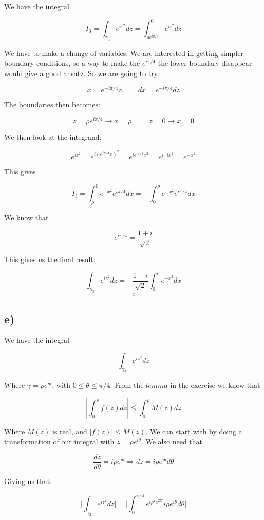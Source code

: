 \documentclass[a4paper,norsk, 10pt]{article}
\begin{document}
We have the integral

$$
\tilde{I}_ 3 = \int_{\gamma_3}e^{iz^2} dz = \int_{\rho e^{i\pi/4}}^0 e^{iz^2} dz 
$$

We have to make a change of variables. We are interested in getting simpler boundary conditions, so a way to make the $e^{i\pi/4}$ the lower boundary disappear would give a good ansatz. So we are going to try:

$$
x = e^{-i\pi/4}z. \qquad dx = e^{-i\pi /4}dz
$$

The boundaries then becomes:

$$
z = \rho e^{i\pi/4} \rightarrow x = \rho, \qquad z = 0 \rightarrow x = 0
$$

We then look at the integrand:

$$
e^{iz^2} = e^{i(e^{i\pi/4}x)^2} = e^{ie^{i\pi/2}x^2} = e^{i\cdot ix^2} = e^{-x^2}
$$

This gives 

$$
\tilde{I}_3 = \int_{\rho}^0 e^{-x^2} e^{i\pi /4} dx = - \int_0^{\rho} e^{-x^2} e^{i\pi /4} dx
$$

We know that 

$$
e^{i\pi/4} =\frac{1+i}{\sqrt{2}}
$$

This gives us the final result:

\begin{equation}
\underline{\underline{\int_{\gamma_3}e^{iz^2} dz = -\frac{1+i}{\sqrt{2}}\int_0^{\rho}e^{-x^2}dx}}
\label{eq:I3}
\end{equation}



\subsection*{e)}
We have the integral

$$
\int_{\gamma_2}e^{iz^2} dz
$$

Where $\gamma = \rho e^{i\theta}$, with $0 \leq \theta \leq \pi/4$. From the $lemma$ in the exercise we know that

$$
|\int_0^{\rho} f(z) dz| \leq \int_0^{\rho} M(z) dz
$$

Where $M(z)$ is real, and $|f(z)| \leq M(z)$. We can start with by doing a transformation of our integral with $z = \rho e^{i\theta}$. We also need that

$$
\frac{dz}{d\theta} = i\rho e^{i\theta} \Rightarrow dz = i\rho e^{i\theta} d\theta
$$

Giving us that:

$$
\big| \int_{\gamma_2}e^{iz^2} dz \big| = \big|\int_0^{\pi/4} e^{i\rho^2 e^{2i\theta}} i\rho e^{i\theta} d\theta \big|
$$
\end{document}
